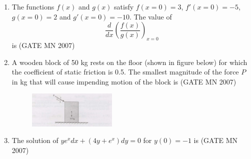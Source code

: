 \documentclass[journal]{IEEEtran}
\begin{document}
\begin{enumerate}
\item The functions $f(x)$ and $g(x)$ satisfy $f(x=0)=3$, $f'(x=0)=-5$, $g(x=0)=2$ and $g'(x=0)=-10$. The value of 
\[
\frac{d}{dx} \left( \frac{f(x)}{g(x)} \right)_{x=0}
\]
is
\hfill (GATE MN 2007)
\begin{enumerate}
\end{enumerate}



\item A wooden block of 50 kg rests on the floor (shown in figure below) for which the coefficient of static friction is 0.5. The smallest magnitude of the force $P$ in kg that will cause impending motion of the block is
	\hfill (GATE MN 2007)
	\begin{figure}[H]
    \centering
\includegraphics[width=0.4\textwidth]{Screenshot_2025_0812_123307.png}
\caption{}
    \label{fig:Q24}
\end{figure}
\begin{enumerate}
\end{enumerate}


\item The solution of $y e^x dx + (4y + e^x) dy = 0$ for $y(0) = -1$ is
	\hfill (GATE MN 2007)
\begin{enumerate}
\end{enumerate}



\end{enumerate}
\end{document}

